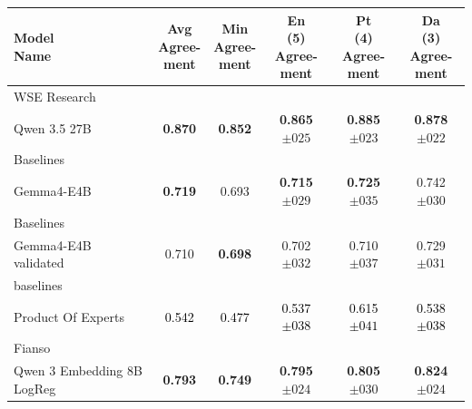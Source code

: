 \begin{tabularx}{\textwidth}{X | c c c c c}
\hline
\makecell[b]{\textbf{Model} \\ \textbf{Name}} & \makecell[b]{\textbf{Avg} \\ \textbf{Agree-} \\ \textbf{ment}} & \makecell[b]{\textbf{Min} \\ \textbf{Agree-} \\ \textbf{ment}} & \makecell[b]{\textbf{En} \\ \textbf{(5)} \\ \textbf{Agree-} \\ \textbf{ment}} & \makecell[b]{\textbf{Pt} \\ \textbf{(4)} \\ \textbf{Agree-} \\ \textbf{ment}} & \makecell[b]{\textbf{Da} \\ \textbf{(3)} \\ \textbf{Agree-} \\ \textbf{ment}} \\
\hline
WSE Research\\\subcatarrow{}Qwen 3.5 27B & \textbf{\textcolor{BrickRed}{0.870}} & \textbf{\textcolor{BrickRed}{0.852}} & \textbf{\textcolor{BrickRed}{0.865$\pm{}025$}} & \textbf{\textcolor{BrickRed}{0.885$\pm{}023$}} & \textbf{\textcolor{BrickRed}{0.878$\pm{}022$}} \\
Baselines\\\subcatarrow{}Gemma4-E4B & \textbf{\textcolor{White!50!BrickRed}{0.719}} & \textcolor{White!50!BrickRed}{0.693} & \textbf{\textcolor{White!50!BrickRed}{0.715$\pm{}029$}} & \textbf{\textcolor{White!50!BrickRed}{0.725$\pm{}035$}} & \textcolor{White!50!BrickRed}{0.742$\pm{}030$} \\
Baselines\\\subcatarrow{}Gemma4-E4B validated & \textcolor{White!50!BrickRed}{0.710} & \textbf{\textcolor{White!50!BrickRed}{0.698}} & \textcolor{White!50!BrickRed}{0.702$\pm{}032$} & \textcolor{White!50!BrickRed}{0.710$\pm{}037$} & \textcolor{White!50!BrickRed}{0.729$\pm{}031$} \\
baselines\\\subcatarrow{}Product Of Experts & \textcolor{Black}{0.542} & \textcolor{Black}{0.477} & \textcolor{Black}{0.537$\pm{}038$} & \textcolor{Black}{0.615$\pm{}041$} & \textcolor{Black}{0.538$\pm{}038$} \\
Fianso\\\subcatarrow{}Qwen 3 Embedding 8B LogReg & \textbf{\textcolor{White!50!BrickRed}{0.793}} & \textbf{\textcolor{White!50!BrickRed}{0.749}} & \textbf{\textcolor{BrickRed}{0.795$\pm{}024$}} & \textbf{\textcolor{White!50!BrickRed}{0.805$\pm{}030$}} & \textbf{\textcolor{BrickRed}{0.824$\pm{}024$}} \\

\end{tabularx}
